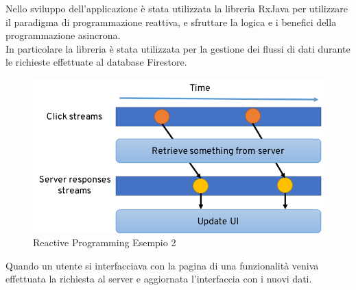    Nello sviluppo dell'applicazione è stata utilizzata la libreria RxJava per utilizzare il paradigma di programmazione reattiva, e sfruttare la logica e i benefici della programmazione asincrona.\\
   In particolare la libreria è stata utilizzata per la gestione dei flussi di dati durante le richieste effettuate al database Firestore.

   \begin{figure}[!hb]
     \centering
     \includegraphics[width=1\textwidth]{immagini/reactive_programming_es2.png}
     \caption{Reactive Programming Esempio 2}\label{fig:Reactive Programming Esempio 2}
   \end{figure}
   
   Quando un utente si interfacciava con la pagina di una funzionalità veniva effettuata la richiesta al server e aggiornata l'interfaccia con i nuovi dati.



\clearpage{\pagestyle{empty}\cleardoublepage}
